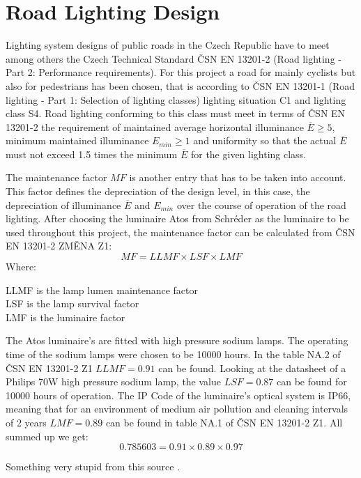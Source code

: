 \section{Road Lighting Design}
Lighting system designs of public roads in the Czech Republic have to meet among others the Czech Technical Standard \v{C}SN EN 13201-2 (Road lighting - Part 2: Performance requirements). For this project a road for mainly cyclists but also for pedestrians has been chosen, that is according to \v{C}SN EN 13201-1 (Road lighting - Part 1: Selection of lighting classes) lighting situation C1 and lighting class S4. Road lighting conforming to this class must meet in terms of \v{C}SN EN 13201-2 the requirement of maintained average horizontal illuminance $\overline{E}\geq 5$, minimum maintained illuminance $E_{min}\geq 1$ and uniformity so that the actual $\overline{E}$ must not exceed 1.5 times the minimum $\overline{E}$ for the given lighting class.

The maintenance factor $MF$ is another entry that has to be taken into account. This factor defines the depreciation of the design level, in this case, the depreciation of illuminance $\overline{E}$ and $E_{min}$ over the course of operation of the road lighting. After choosing the luminaire Atos from Schr\'{e}der as the luminaire to be used throughout this project, the maintenance factor can be calculated from \v{C}SN EN 13201-2 ZM\v{E}NA Z1:
\begin{equation}
MF=LLMF \times LSF \times LMF
\end{equation}
Where:
\begin{description}
	\item[LLMF is the lamp lumen maintenance factor]
	\item[LSF is the lamp survival factor]
	\item[LMF is the luminaire factor]
\end{description}

The Atos luminaire's are fitted with high pressure sodium lamps. The operating time of the sodium lamps were chosen to be 10000 hours. In the table NA.2 of \v{C}SN EN 13201-2 Z1 $LLMF=0.91$ can be found. Looking at the datasheet of a Philips 70W high pressure sodium lamp, the value $LSF=0.87$ can be found for 10000 hours of operation. The IP Code of the luminaire's optical system is IP66, meaning that for an environment of medium air pollution and cleaning intervals of 2 years $LMF=0.89$ can be found in table NA.1 of \v{C}SN EN 13201-2 Z1. All summed up we get:
\begin{equation}
0.785603=0.91 \times 0.89 \times 0.97
\end{equation}

Something very stupid from this source \cite{CSN_EN_13201-1}.